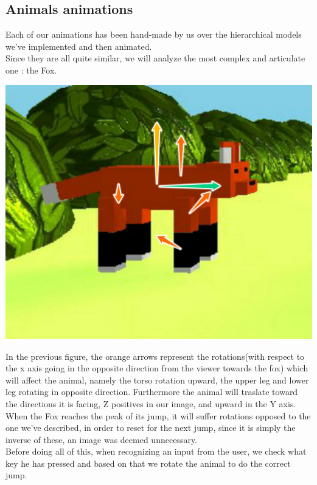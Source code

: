 \documentclass[a4paper, 11pt]{article}
\begin{document}
\subsection{Animals animations}
Each of our animations has been hand-made by us over the hierarchical models we've implemented and then animated.\\
Since they are all quite similar, we will analyze the most complex and articulate one : the Fox.\\
\begin{center}
	\includegraphics[scale=0.2]{FoxAnimation.jpeg}\\
\end{center}
In the previous figure, the orange arrows represent the rotations(with respect to the x axis going in the opposite direction from the viewer towards the fox) which will affect the animal, namely the torso rotation upward, the upper leg and lower leg rotating in opposite direction. Furthermore the animal will traslate toward the directions it is facing, Z positives in our image, and upward in the Y axis.\\ When the Fox reaches the peak of its jump, it will suffer rotations opposed to the one we've described, in order to reset for the next jump, since it is simply the inverse of these, an image was deemed unnecessary.\\
Before doing all of this, when recognizing an input from the user, we check what key he has pressed and based on that we rotate the animal to do the correct jump.\\
\end{document}
